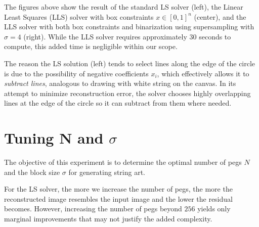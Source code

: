 The figures above show the result of the standard LS solver (left), the Linear Least Squares (LLS) solver with box constraints \(x \in \left[0, 1\right]^{n}\) (center), and the LLS solver with both box constraints and binarization using supersampling with \(\sigma = 4\) (right). While the LLS solver requires approximately 30 seconds to compute, this added time is negligible within our scope.

The reason the LS solution (left) tends to select lines along the edge of the circle is due to the possibility of negative coefficients \(x_i\), which effectively allows it to \textit{subtract lines}, analogous to drawing with white string on the canvas. In its attempt to minimize reconstruction error, the solver chooses highly overlapping lines at the edge of the circle so it can subtract from them where needed.

\section{\texorpdfstring{Tuning N and $\sigma$}{Tuning N and sigma}}

The objective of this experiment is to determine the optimal number of pegs \(N\) and the block size \(\sigma\) for generating string art.

For the LS solver, the more we increase the number of pegs, the more the reconstructed image resembles the input image and the lower the residual becomes. However, increasing the number of pegs beyond \(256\) yields only marginal improvements that may not justify the added complexity.

